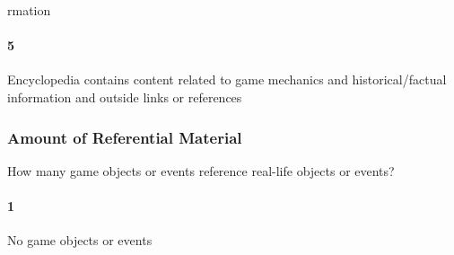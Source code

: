 rmation\paragraph{5}Encyclopedia contains content related to game mechanics and historical/factual information and outside links or references\subsubsection{Amount of Referential Material}How many game objects or events reference real-life objects or events?\paragraph{1}No game objects or events